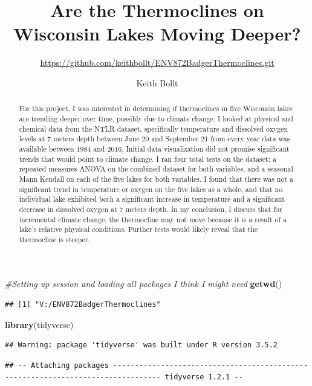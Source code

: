 \documentclass[12pt,]{article}
\title{Are the Thermoclines on Wisconsin Lakes Moving Deeper?}
\subtitle{\url{https://github.com/keithbollt/ENV872BadgerThermoclines.git}}
\author{Keith Bollt}
\date{}
\newenvironment{Shaded}{\begin{snugshade}}{\end{snugshade}}
\newcommand{\KeywordTok}[1]{\textcolor[rgb]{0.13,0.29,0.53}{\textbf{#1}}}
\newcommand{\CommentTok}[1]{\textcolor[rgb]{0.56,0.35,0.01}{\textit{#1}}}
\newcommand{\NormalTok}[1]{#1}
\begin{document}
\maketitle
\begin{abstract}
For this project, I was interested in determining if thermoclines in
five Wisconsin lakes are trending deeper over time, possibly due to
climate change. I looked at physical and chemical data from the NTLR
dataset, specifically temperature and dissolved oxygen levels at 7
meters depth between June 20 and September 21 from every year data was
available between 1984 and 2016. Initial data visualization did not
promise significant trends that would point to climate change. I ran
four total tests on the dataset: a repeated measures ANOVA on the
combined dataset for both variables, and a seasonal Mann Kendall on each
of the five lakes for both variables. I found that there was not a
significant trend in temperature or oxygen on the five lakes as a whole,
and that no individual lake exhibited both a significant increase in
temperature and a significant decrease in dissolved oxygen at 7 meters
depth. In my conclusion, I discuss that for incremental climate change,
the thermocline may not move because it is a result of a lake's relative
physical conditions. Further tests would likely reveal that the
thermocline is steeper.
\end{abstract}

\begin{Shaded}
\begin{Highlighting}[]
\CommentTok{#Setting up session and loading all packages I think I might need}
\KeywordTok{getwd}\NormalTok{()}
\end{Highlighting}
\end{Shaded}

\begin{verbatim}
## [1] "V:/ENV872BadgerThermoclines"
\end{verbatim}

\begin{Shaded}
\begin{Highlighting}[]
\KeywordTok{library}\NormalTok{(tidyverse)}
\end{Highlighting}
\end{Shaded}

\begin{verbatim}
## Warning: package 'tidyverse' was built under R version 3.5.2
\end{verbatim}

\begin{verbatim}
## -- Attaching packages --------------------------------------------------------------------------------- tidyverse 1.2.1 --
\end{verbatim}
\end{document}
